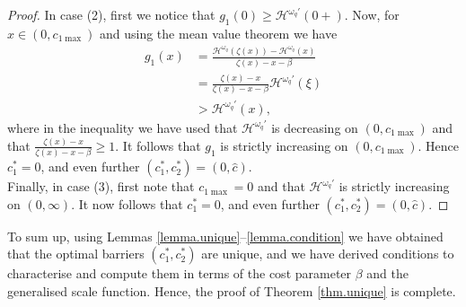 \documentclass[11pt,reqno]{amsart}
\newcommand{\cH}{\mathcal{H}}
\newcommand{\homega}{\omega_q}
\newcommand{\PAR}[1]{{{\left(#1\right)}}} %
\renewcommand{\geq}{\geqslant}
\begin{document}
\begin{proof}
	In case (2), first we notice that $g_1(0) \geq \cH^{\homega\prime}(0+)$. Now, for $x \in (0,c_{1\max})$ and using the mean value theorem we have
	\begin{align*}
		g_1(x) &= \frac{\cH^{\homega}(\zeta(x)) - \cH^{\homega}(x)}{\zeta(x) - x -\beta}\\
		&=\frac{\zeta(x) - x}{\zeta(x) - x -\beta}\cH^{\homega\prime}(\xi)\\
		&> \cH^{\homega\prime}(x),
	\end{align*}
	where in the inequality we have used that $\cH^{\homega\prime}$ is decreasing on $(0,c_{1\max})$ and that $\frac{\zeta(x) - x}{\zeta(x) - x -\beta} \geq 1$. It follows that $g_1$ is strictly increasing on $(0,c_{1\max})$. Hence $c_1^{\ast} = 0$, and even further $(c_1^\ast,c_2^\ast) = (0,\hat{c})$.\\
	Finally, in case (3), first note that $c_{1\max} = 0$ and that $\cH^{\homega\prime}$ is strictly increasing on $(0,\infty)$. It now follows that  $c_1^{\ast} = 0$, and even further $(c_1^\ast,c_2^\ast) = (0,\hat{c})$.
\end{proof}
To sum up, using Lemmas \eqref{lemma.unique}--\eqref{lemma.condition} we have obtained that the optimal barriers $(c_1^\ast,c_2^\ast)$ are unique, and we have derived conditions to characterise and compute them in terms of the cost parameter $\beta$ and the generalised scale function. Hence, the proof of Theorem \ref{thm.unique} is complete.
\end{document}
